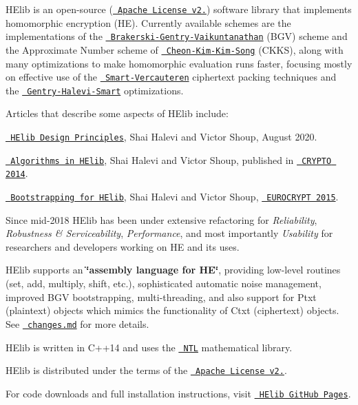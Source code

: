 H\+Elib is an open-\/source (\href{http://www.apache.org/licenses/LICENSE-2.0}{\texttt{ Apache License v2.}}) software library that implements homomorphic encryption (HE). Currently available schemes are the implementations of the \href{http://eprint.iacr.org/2011/277}{\texttt{ Brakerski-\/\+Gentry-\/\+Vaikuntanathan}} (B\+GV) scheme and the Approximate Number scheme of \href{http://eprint.iacr.org/2016/421}{\texttt{ Cheon-\/\+Kim-\/\+Kim-\/\+Song}} (C\+K\+KS), along with many optimizations to make homomorphic evaluation runs faster, focusing mostly on effective use of the \href{http://eprint.iacr.org/2011/133}{\texttt{ Smart-\/\+Vercauteren}} ciphertext packing techniques and the \href{http://eprint.iacr.org/2012/099}{\texttt{ Gentry-\/\+Halevi-\/\+Smart}} optimizations.

Articles that describe some aspects of H\+Elib include\+:


\begin{DoxyItemize}
\item \href{https://homenc.github.io/HElib/documentation/Design_Document/HElib-design.pdf}{\texttt{ H\+Elib Design Principles}}, Shai Halevi and Victor Shoup, August 2020.
\item \href{http://eprint.iacr.org/2014/106}{\texttt{ Algorithms in H\+Elib}}, Shai Halevi and Victor Shoup, published in \href{http://www.iacr.org/conferences/crypto2014/}{\texttt{ C\+R\+Y\+P\+TO 2014}}.
\item \href{http://eprint.iacr.org/2014/873}{\texttt{ Bootstrapping for H\+Elib}}, Shai Halevi and Victor Shoup, \href{https://www.cosic.esat.kuleuven.be/eurocrypt_2015/}{\texttt{ E\+U\+R\+O\+C\+R\+Y\+PT 2015}}.
\end{DoxyItemize}

Since mid-\/2018 H\+Elib has been under extensive refactoring for {\itshape Reliability}, {\itshape Robustness \& Serviceability}, {\itshape Performance}, and most importantly {\itshape Usability} for researchers and developers working on HE and its uses.

H\+Elib supports an {\bfseries{\char`\"{}assembly language for H\+E\char`\"{}}}, providing low-\/level routines (set, add, multiply, shift, etc.), sophisticated automatic noise management, improved B\+GV bootstrapping, multi-\/threading, and also support for Ptxt (plaintext) objects which mimics the functionality of Ctxt (ciphertext) objects. See \href{https://github.com/homenc/HElib/changes.md}{\texttt{ changes.\+md}} for more details.

H\+Elib is written in C++14 and uses the \href{http://www.shoup.net/ntl/}{\texttt{ N\+TL}} mathematical library.

H\+Elib is distributed under the terms of the \href{http://www.apache.org/licenses/LICENSE-2.0}{\texttt{ Apache License v2.}}. ~\newline


For code downloads and full installation instructions, visit \href{https://github.com/homenc/HElib}{\texttt{ H\+Elib Git\+Hub Pages}}. 